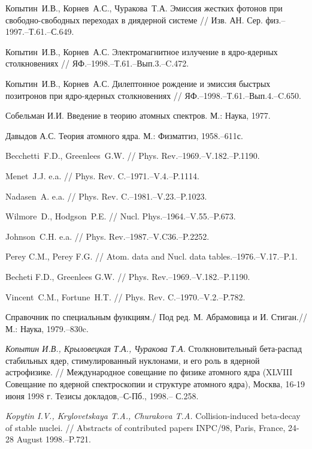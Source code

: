 \begin{thebibliography}{200}
Копытин~И.В., Корнев~А.С., Чуракова~Т.А.
 Эмиссия жестких фотонов при свободно-свободных переходах в диядерной системе
// Изв. АН. Сер. физ.--1997.--Т.61.--С.649.

Копытин~И.В., Корнев~А.С.
 Электромагнитное излучение в ядро-ядерных столкновениях
// ЯФ.--1998.--Т.61.--Вып.3.--C.472.

Копытин~И.В., Корнев~А.С.
 Дилептонное рождение и эмиссия быстрых позитронов при ядро-ядерных столкновениях
// ЯФ.--1998.--Т.61.--Вып.4.--C.650.


Собельман И.И. Введение в теорию атомных спектров. М.: Наука, 1977.

Давыдов А.С. Теория атомного ядра. М.: Физматгиз, 1958.--611с.


Becchetti~F.D., Greenlees~G.W. // Phys. Rev.--1969.--V.182.--P.1190.

Menet~J.J. e.a. // Phys. Rev. C.--1971.--V.4.--P.1114.

Nadasen~A. e.a. // Phys. Rev. C.--1981.--V.23.--P.1023.

Wilmore~D., Hodgson~P.E. // Nucl. Phys.--1964.--V.55.--P.673.

Johnson~C.H. e.a. // Phys. Rev.--1987.--V.C36.--P.2252.

Perey C.M., Perey F.G. // Atom. data and Nucl. data tables.--1976.--V.17.--P.1.

Becheti F.D., Greenlees G.W. // Phys. Rev.--1969.--V.182.--P.1190.

Vincent~C.M., Fortune~H.T. // Phys. Rev. C.--1970.--V.2.--P.782.

Справочник по специальным функциям./ Под ред. М. Абрамовица и И. Стиган.//
М.: Наука, 1979.--830c.

\textit{Копытин И.В., Крыловецкая Т.А., Чуракова Т.А.} Столкновительный
бета-распад
 стабильных ядер, стимулированный нуклонами, и его роль в
ядерной астрофизике. // Международное совещание по физике атомного
ядра (XLVIII Совещание по ядерной спектроскопии и структуре атомного
ядра), Москва, 16-19 июня 1998 г. Тезисы докладов,--С-Пб., 1998.--
С.258.

\textit{Kopytin I.V., Krylovetskaya T.A., Churakova T.A.} Collision-induced
beta-decay of stable nuclei. // Abstracts of contributed papers INPC/98, Paris,
France, 24-28 August 1998.--P.721.


\end{thebibliography}
